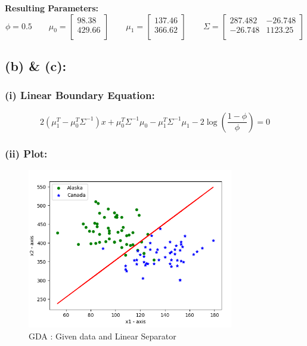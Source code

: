 \documentclass[a4 paper]{article}
\begin{document}
\textbf{Resulting Parameters:}
$$ \phi = 0.5 \quad \quad
\mu_0 = 
\begin{bmatrix}
	98.38 \\ 429.66\\
\end{bmatrix} \quad \quad
\mu_1 = 
\begin{bmatrix}
	137.46 \\ 366.62 \\ 
\end{bmatrix} \quad \quad
\Sigma = 
\begin{bmatrix}
	287.482 & -26.748 \\ 
    -26.748 & 1123.25  \\
\end{bmatrix} $$

\subsection*{(b) \& (c):}
\subsubsection*{(i) Linear Boundary Equation:}

	$$ 2(\mu_1^T - \mu_0^T\Sigma^{-1})x + \mu_0^T \Sigma^{-1} \mu_0 - \mu_1^T \Sigma^{-1} \mu_1 - 2\log\left(\frac{1-\phi}{\phi}\right) = 0$$

\subsubsection*{(ii) Plot:}
\begin{figure}[!htb]
	\centering
	  \includegraphics[width = 90mm]{./Plots/4a.png}
	  \caption{GDA : Given data and Linear Separator}
  	\label{fig8}
\end{figure}
\end{document}
